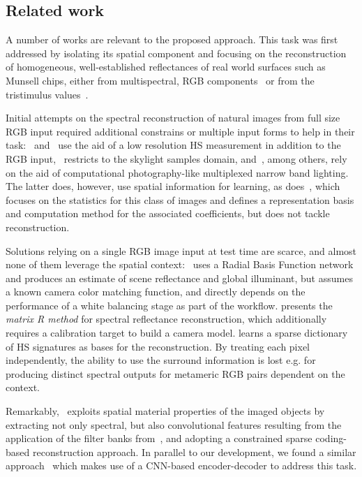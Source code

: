 \documentclass[10pt,twocolumn,letterpaper]{article}
\begin{document}
\subsection{Related work}
\label{sec:related}

A number of works are relevant to the proposed approach.
This task was first addressed by isolating its spatial component and focusing on the reconstruction of homogeneous, well-established reflectances of real world surfaces such as Munsell chips, either from multispectral, RGB components~\cite{heikkinen_evaluation_2008} or from the tristimulus values~\cite{ayala_use_2006,agahian_reconstruction_2008}.

Initial attempts on the spectral reconstruction of natural images from full size RGB input required additional constrains or multiple input forms to help in their task:~\cite{kawakami_high-resolution_2011} and~\cite{cao_high_2011} use the aid of a low resolution HS measurement in addition to the RGB input,~\cite{lopez-alvarez_using_2008} restricts to the skylight samples domain, and~\cite{park_multispectral_2007,parmar_spatio-spectral_2008,goel_hypercam:_2015}, among others, rely on the aid of computational photography-like multiplexed narrow band lighting. The latter does, however, use spatial information for learning, as does~\cite{chakrabarti2011statistics}, which focuses on the statistics for this class of images and defines a representation basis and computation method for the associated coefficients, but does not tackle reconstruction.

Solutions relying on a single RGB image input at test time are scarce, and almost none of them leverage the spatial context:~\cite{nguyen_training-based_2014} uses a Radial Basis Function network and produces an estimate of scene reflectance and global illuminant, but assumes a known camera color matching function, and directly depends on the performance of a white balancing stage as part of the workflow.
\cite{zhao_image-based_2007} presents the \emph{matrix R method} for spectral reflectance reconstruction, which additionally requires a calibration target to build a camera model.
\cite{arad_sparse_2016} learns a sparse dictionary of HS signatures as bases for the reconstruction.
By treating each pixel independently, the ability to use the surround information is lost e.g. for producing distinct spectral outputs for metameric RGB pairs dependent on the context.

Remarkably,~\cite{RoblesKelly2015SingleIS} exploits spatial material properties of the imaged objects by extracting not only spectral, but also convolutional features resulting from the application of the filter banks from~\cite{varma_classifying_2002}, and adopting a constrained sparse coding-based reconstruction approach. In parallel to our development, we found a similar approach~\cite{galliani_learned_2017} which makes use of a CNN-based encoder-decoder to address this task.
\end{document}

